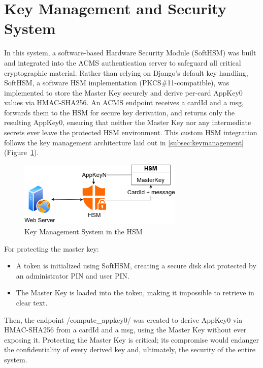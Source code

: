 \section{Key Management and Security System}
In this system, a software-based Hardware Security Module (SoftHSM) was built and integrated into the ACMS authentication server to safeguard all critical cryptographic material. Rather than relying on Django’s default key handling, SoftHSM, a software HSM implementation (PKCS\#11-compatible), was implemented to store the Master Key securely and derive per-card AppKey0 values via HMAC-SHA256. An ACMS endpoint receives a cardId and a msg, forwards them to the HSM for secure key derivation, and returns only the resulting AppKey0, ensuring that neither the Master Key nor any intermediate secrets ever leave the protected HSM environment. This custom HSM integration follows the key management architecture laid out in \ref{subsec:keymanagement} (Figure~\ref{fig:key_management}).

\begin{figure}[h]
	\centering
	\includegraphics[width=0.7\textwidth]{imaxes/KEY_MANA} %
	\caption{Key Management System in the HSM}
	\label{fig:key_management}
\end{figure}

For protecting the master key:
\begin{itemize}
	\item A token is initialized using SoftHSM, creating a secure disk slot protected by an administrator PIN and user PIN.
	\item The Master Key is loaded into the token, making it impossible to retrieve in clear text.
\end{itemize}

Then, the endpoint /compute\_appkey0/ was created to derive AppKey0 via HMAC-SHA256 from a cardId and a msg, using the Master Key without ever exposing it. Protecting the Master Key is critical; its compromise would endanger the confidentiality of every derived key and, ultimately, the security of the entire system.

